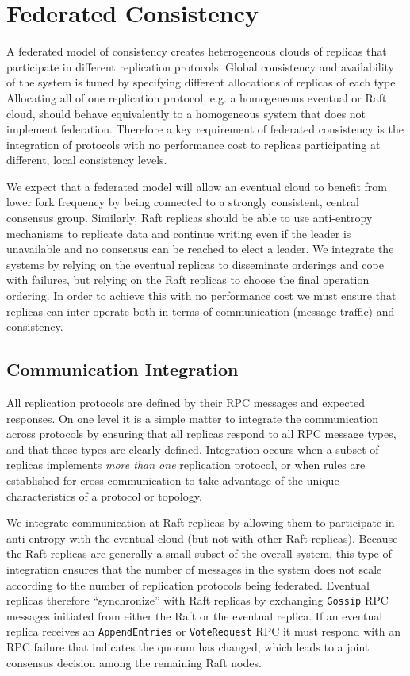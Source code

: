 \documentclass[10pt,conference,letterpaper]{IEEEtran}
\begin{document}
\section{Federated Consistency}
\label{sec:federated}

A federated model of consistency creates heterogeneous clouds of replicas that participate
in different replication protocols.
Global consistency and availability of the system is tuned by specifying different
allocations of replicas of each type.
Allocating all of one replication protocol, e.g. a homogeneous eventual or Raft cloud,
should behave equivalently to a homogeneous system that does not implement federation.
Therefore a key requirement of federated consistency is the integration of protocols with
no performance cost to replicas participating at different, local consistency levels.

We expect that a federated model will allow an eventual cloud to benefit from lower fork
frequency by being connected to a strongly consistent, central consensus group.
Similarly, Raft replicas should be able to use anti-entropy mechanisms to replicate data
and continue writing even if the leader is unavailable and no consensus can be reached to
elect a leader.
We integrate the systems by relying on the eventual replicas to disseminate orderings and
cope with failures, but relying on the Raft replicas to choose the final operation
ordering.
In order to achieve this with no performance cost we must ensure that replicas can
inter-operate both in terms of communication (message traffic) and consistency.

\subsection{Communication Integration}

All replication protocols are defined by their RPC messages and expected responses.
On one level it is a simple matter to integrate the communication across protocols by
ensuring that all replicas respond to all RPC message types, and that those types are
clearly defined.
Integration occurs when a subset of replicas implements \textit{more than one}
replication protocol, or when rules are established for cross-communication to take
advantage of the unique characteristics of a protocol or topology.

We integrate communication at Raft replicas by allowing them to participate in
anti-entropy with the eventual cloud (but not with other Raft replicas).
Because the Raft replicas are generally a small subset of the overall system, this type
of integration ensures that the number of messages in the system does not scale according
to the number of replication protocols being federated.
Eventual replicas therefore ``synchronize'' with Raft replicas by exchanging
\texttt{Gossip} RPC messages initiated from either the Raft or the eventual
replica.
If an eventual replica receives an \texttt{AppendEntries} or \texttt{VoteRequest} RPC it
must respond with an RPC failure that indicates the quorum has changed, which leads to a
joint consensus decision among the remaining Raft nodes.
\end{document}
